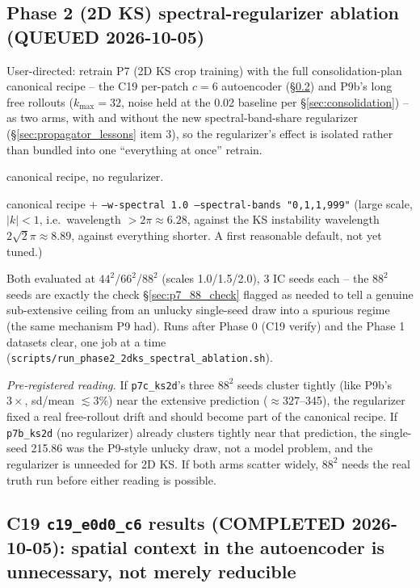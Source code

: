 \documentclass[11pt]{article}
\begin{document}
\subsection{Phase 2 (2D KS) spectral-regularizer ablation
(QUEUED 2026-10-05)}
\label{sec:phase2_spectral_ablation}

User-directed: retrain P7 (2D KS crop training) with the full
consolidation-plan canonical recipe -- the C19 per-patch $c{=}6$
autoencoder (\S\ref{sec:c19_c6_results}) and P9b's long free rollouts
($k_{\max}{=}32$, noise held at the 0.02 baseline per
\S\ref{sec:consolidation}) -- as two arms, with and without the new
spectral-band-share regularizer (\S\ref{sec:propagator_lessons} item 3),
so the regularizer's effect is isolated rather than bundled into one
``everything at once'' retrain.
\begin{description}[leftmargin=*]
\item[\texttt{p7b\_ks2d}] canonical recipe, no regularizer.
\item[\texttt{p7c\_ks2d}] canonical recipe + \texttt{--w-spectral 1.0
  --spectral-bands "0,1,1,999"} (large scale, $|k|<1$, i.e.\ wavelength
  $>2\pi\approx6.28$, against the KS instability wavelength
  $2\sqrt2\pi\approx8.89$, against everything shorter. A first
  reasonable default, not yet tuned.)
\end{description}
Both evaluated at $44^2$/$66^2$/$88^2$ (scales 1.0/1.5/2.0), 3 IC seeds
each -- the $88^2$ seeds are exactly the check
\S\ref{sec:p7_88_check} flagged as needed to tell a genuine
sub-extensive ceiling from an unlucky single-seed draw into a spurious
regime (the same mechanism P9 had). Runs after Phase 0 (C19 verify) and
the Phase 1 datasets clear, one job at a time
(\texttt{scripts/run\_phase2\_2dks\_spectral\_ablation.sh}).

\emph{Pre-registered reading.} If \texttt{p7c\_ks2d}'s three $88^2$
seeds cluster tightly (like P9b's $3\times$, sd/mean $\lesssim3\%$) near
the extensive prediction ($\approx327$--345), the regularizer fixed a
real free-rollout drift and should become part of the canonical recipe.
If \texttt{p7b\_ks2d} (no regularizer) already clusters tightly near
that prediction, the single-seed 215.86 was the P9-style unlucky draw,
not a model problem, and the regularizer is unneeded for 2D KS. If both
arms scatter widely, $88^2$ needs the real truth run before either
reading is possible.

\subsection{C19 \texttt{c19\_e0d0\_c6} results (COMPLETED 2026-10-05):
spatial context in the autoencoder is unnecessary, not merely reducible}
\label{sec:c19_c6_results}
\end{document}
